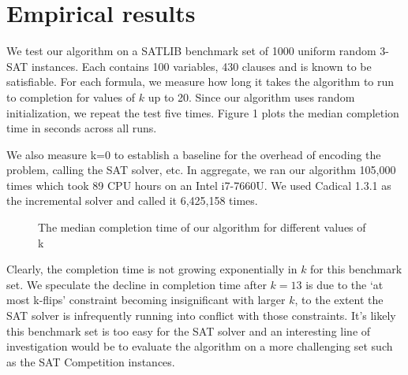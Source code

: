 \documentclass{article}
\begin{document}
\break

\section{Empirical results}

We test our algorithm on a SATLIB benchmark set of 1000 uniform random 3-SAT
instances\cite{satlibproblems}. Each contains 100 variables, 430 clauses and is
known to be satisfiable. For each formula, we measure how long it takes the
algorithm to run to completion for values of $k$ up to 20. Since our algorithm
uses random initialization, we repeat the test five times. Figure 1 plots the
median completion time in seconds across all runs.

We also measure k=0 to establish a baseline for the overhead of encoding the
problem, calling the SAT solver, etc. In aggregate, we ran our algorithm 105,000
times which took 89 CPU hours on an Intel i7-7660U. We used Cadical 1.3.1 as the
incremental solver\cite{biere2017cadical} and called it 6,425,158 times. \\

\begin{figure}[htp]
\caption{The median completion time of our algorithm for different values of k}
\end{figure}

\noindent Clearly, the completion time is not growing exponentially in $k$ for
this benchmark set. We speculate the decline in completion time after $k=13$ is
due to the ‘at most k-flips’ constraint becoming insignificant with larger $k$,
to the extent the SAT solver is infrequently running into conflict with those
constraints. It's likely this benchmark set is too easy for the SAT solver and
an interesting line of investigation would be to evaluate the algorithm on a
more challenging set such as the SAT Competition instances.
\end{document}

